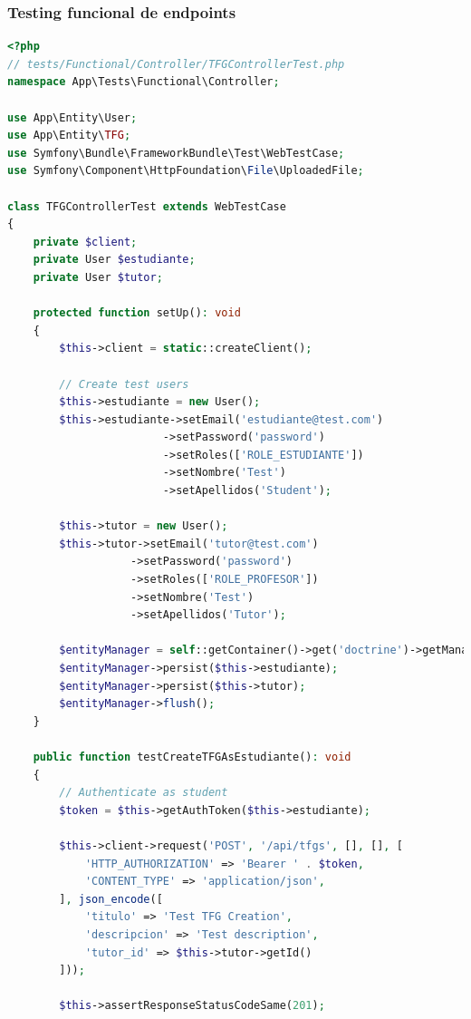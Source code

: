 \documentclass[12pt,a4paper,oneside]{report}
\begin{document}
\subsubsection{Testing funcional de
endpoints}\label{testing-funcional-de-endpoints}

\begin{lstlisting}[language=PHP]
<?php
// tests/Functional/Controller/TFGControllerTest.php
namespace App\Tests\Functional\Controller;

use App\Entity\User;
use App\Entity\TFG;
use Symfony\Bundle\FrameworkBundle\Test\WebTestCase;
use Symfony\Component\HttpFoundation\File\UploadedFile;

class TFGControllerTest extends WebTestCase
{
    private $client;
    private User $estudiante;
    private User $tutor;

    protected function setUp(): void
    {
        $this->client = static::createClient();
        
        // Create test users
        $this->estudiante = new User();
        $this->estudiante->setEmail('estudiante@test.com')
                        ->setPassword('password')
                        ->setRoles(['ROLE_ESTUDIANTE'])
                        ->setNombre('Test')
                        ->setApellidos('Student');

        $this->tutor = new User();
        $this->tutor->setEmail('tutor@test.com')
                   ->setPassword('password')
                   ->setRoles(['ROLE_PROFESOR'])
                   ->setNombre('Test')
                   ->setApellidos('Tutor');

        $entityManager = self::getContainer()->get('doctrine')->getManager();
        $entityManager->persist($this->estudiante);
        $entityManager->persist($this->tutor);
        $entityManager->flush();
    }

    public function testCreateTFGAsEstudiante(): void
    {
        // Authenticate as student
        $token = $this->getAuthToken($this->estudiante);

        $this->client->request('POST', '/api/tfgs', [], [], [
            'HTTP_AUTHORIZATION' => 'Bearer ' . $token,
            'CONTENT_TYPE' => 'application/json',
        ], json_encode([
            'titulo' => 'Test TFG Creation',
            'descripcion' => 'Test description',
            'tutor_id' => $this->tutor->getId()
        ]));

        $this->assertResponseStatusCodeSame(201);
        

\end{lstlisting}
\end{document}
